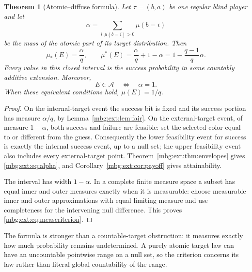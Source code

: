 \documentclass[11pt,letterpaper]{article}
\newtheorem{theorem}{Theorem}[section]
\theoremstyle{definition}
\newcommand{\A}{\mathcal A}
\begin{document}
\begin{theorem}[Atomic--diffuse formula]
\label{mbg:ext:thm:alpha}
Let $\tau=(b,a)$ be one regular blind player and let
\[
\alpha=\sum_{i:\mu(b=i)>0}\mu(b=i)
\]
be the mass of the atomic part of its target distribution. Then
\begin{equation}
\boxed{\quad
\mu_*(E)=\frac{\alpha}{q},\qquad
\mu^*(E)=\frac{\alpha}{q}+1-\alpha
=1-\frac{q-1}{q}\alpha.
\quad}
\label{mbg:ext:eq:alpha}
\end{equation}
Every value in this closed interval is the success probability in some countably additive extension. Moreover,
\begin{equation}
E\in\A\quad\Longleftrightarrow\quad\alpha=1.
\label{mbg:ext:eq:meascriterion}
\end{equation}
When these equivalent conditions hold, $\mu(E)=1/q$.
\end{theorem}
\begin{proof}
On the internal-target event the success bit is fixed and its success portion has measure $\alpha/q$, by Lemma~\ref{mbg:ext:lem:fair}. On the external-target event, of measure $1-\alpha$, both success and failure are feasible: set the selected color equal to or different from the guess. Consequently the lower feasibility event for success is exactly the internal success event, up to a null set; the upper feasibility event also includes every external-target point. Theorem~\ref{mbg:ext:thm:envelopes} gives \eqref{mbg:ext:eq:alpha}, and Corollary~\ref{mbg:ext:cor:payoff} gives attainability.

The interval has width $1-\alpha$. In a complete finite measure space a subset has equal inner and outer measures exactly when it is measurable: choose measurable inner and outer approximations with equal limiting measure and use completeness for the intervening null difference. This proves \eqref{mbg:ext:eq:meascriterion}.
\end{proof}

The formula is stronger than a countable-target obstruction: it measures exactly how much probability remains undetermined. A purely atomic target law can have an uncountable pointwise range on a null set, so the criterion concerns its law rather than literal global countability of the range.
\end{document}
